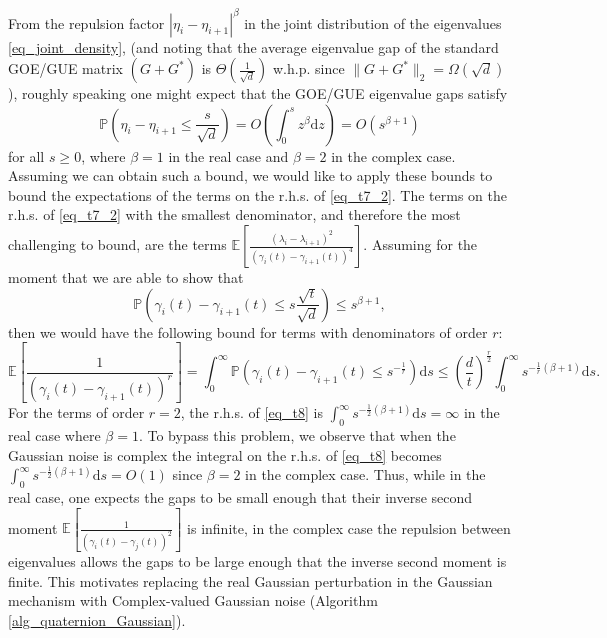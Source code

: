 \documentclass[11pt,letterpaper]{article}
\begin{document}
From the repulsion factor $|\eta_i- \eta_{i+1}|^\beta$ in the joint distribution of the eigenvalues \eqref{eq_joint_density}, (and noting that the average eigenvalue gap of the standard GOE/GUE matrix $(G+G^\ast)$ is $\Theta\left(\frac{1}{\sqrt{d}}\right)$ w.h.p. since $\|G+G^\ast\|_2 = \Omega(\sqrt{d})$), roughly speaking one might expect that the GOE/GUE eigenvalue gaps satisfy $$  \mathbb{P}\left(\eta_i- \eta_{i+1} \leq \frac{s}{\sqrt{d}}\right) = O\left(\int_0^s z^\beta \mathrm{d}z\right) = O\left(s^{\beta +1}\right)$$ for all $s \geq 0$, where $\beta = 1$ in the real case and $\beta = 2$ in the complex case.
%
Assuming we can obtain such a bound, we would like to apply these bounds to bound the expectations of the terms on the r.h.s. of  \eqref{eq_t7_2}.  
%
The terms on the r.h.s. of  \eqref{eq_t7_2} with the smallest denominator, and therefore the most challenging to bound, are the terms $\mathbb{E}\left[\frac{(\lambda_i- \lambda_{i+1})^2}{(\gamma_i(t) - \gamma_{i+1}(t))^4}\right]$.
%
Assuming for the moment that we are able to show that
%
\begin{equation}\label{eq_conjectured_gap_bounds}
     \mathbb{P}\left(\gamma_i(t)- \gamma_{i+1}(t) \leq s\frac{\sqrt{t}}{\sqrt{d}}\right) \leq s^{\beta +1},
    \end{equation}
   then we would have the following bound for terms with denominators of order $r$:
%
\begin{equation}\label{eq_t8}
 \mathbb{E}\left[\frac{1}{(\gamma_i(t) - \gamma_{i+1}(t))^r}\right] 
 = \int_0^{\infty} \mathbb{P}\left(\gamma_i(t)- \gamma_{i+1}(t) \leq s^{-\frac{1}{r}}\right) \mathrm{d}s
%
 \leq  \left(\frac{d}{t}\right)^{\frac{r}{2}}\int_0^\infty s^{-\frac{1}{r}{(\beta+1)}}\mathrm{d}s.
\end{equation}
%
For the terms of order $r=2$, the r.h.s. of \eqref{eq_t8} is  $\int_0^\infty s^{-\frac{1}{2}{(\beta+1)}}\mathrm{d}s= \infty$ in the real case where $\beta=1$.
%
To bypass this problem, we observe that when the Gaussian noise is complex the integral on the r.h.s. of \eqref{eq_t8} becomes  $\int_0^\infty s^{-\frac{1}{2}{(\beta+1)}}\mathrm{d}s= O(1)$ since $\beta=2$ in the complex case.
%
Thus, while in the real case, one expects the gaps to be small enough that their inverse second moment $\mathbb{E}\left[\frac{1}{(\gamma_i(t) - \gamma_j(t))^2}\right]$ is infinite, in the complex case the repulsion between eigenvalues allows the gaps to be large enough that the inverse second moment is finite.
%
This motivates replacing the real Gaussian perturbation in the Gaussian mechanism with Complex-valued Gaussian noise (Algorithm \ref{alg_quaternion_Gaussian}).
%
\end{document}
